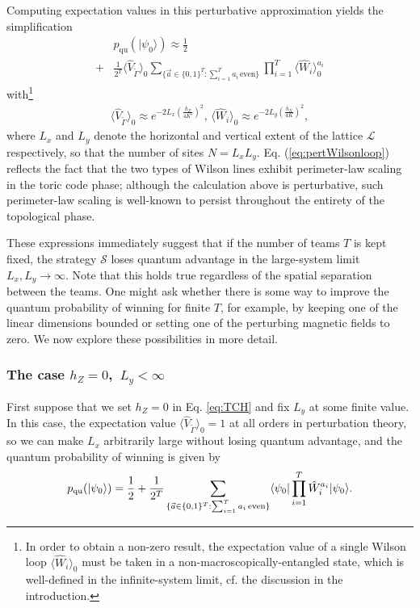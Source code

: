 \documentclass[prb,twocolumn,showpacs,amssymb,superscriptaddress]{revtex4-2}
\begin{document}
Computing expectation values in this perturbative approximation yields the simplification
\begin{align}
    \nonumber &p_{\mathrm{qu}}(|\psi_0\rangle) \approx \frac{1}{2} \\
+ &\frac{1}{2^T} \langle \hat{V}_{\widetilde{\Gamma}} \rangle_0 \sum_{\{\vec{a} \in \{0,1\}^T : \sum_{i=1}^T a_i \, \mathrm{even}\}} \prod_{i=1}^T \langle \hat{W}_i  \rangle_0^{a_i}
\end{align}
with\footnote{In order to obtain a non-zero result, the expectation value of a single Wilson loop $\langle \hat{W}_i \rangle_0$ must be taken in a non-macroscopically-entangled state, which is well-defined in the infinite-system limit, cf. the discussion in the introduction.}
\begin{align}
\label{eq:pertWilsonloop}
\langle \hat{V}_{\widetilde{\Gamma}} \rangle_0 \approx e^{-2L_x\left(\frac{h_Z}{4K'}\right)^2}, \,
\langle \hat{W}_{i} \rangle_0 \approx e^{-2L_y\left(\frac{h_X}{4K}\right)^2},
\end{align}
where $L_x$ and $L_y$ denote the horizontal and vertical extent of the lattice $\mathcal{L}$ respectively, so that the number of sites $N=L_xL_y$. Eq. (\ref{eq:pertWilsonloop}) reflects the fact that the two types of Wilson lines exhibit perimeter-law scaling in the toric code phase; although the calculation above is perturbative, such perimeter-law scaling is well-known to persist throughout the entirety of the topological phase\cite{gregor2011diagnosing}.

These expressions immediately suggest that if the number of teams $T$ is kept fixed, the strategy $\mathcal{S}$ loses quantum advantage in the large-system limit $L_x, L_y \to \infty$. Note that this holds true regardless of the spatial separation between the teams. One might ask whether there is some way to improve the quantum probability of winning for finite $T$, for example, by keeping one of the linear dimensions bounded or setting one of the perturbing magnetic fields to zero. We now explore these possibilities in more detail.

\subsubsection{The case $h_Z=0$,\, $L_y < \infty$}
First suppose that we set $h_Z = 0$ in Eq. \eqref{eq:TCH} and fix $L_y$ at some finite value. In this case, the expectation value $\langle \hat{V}_{\widetilde{\Gamma}}\rangle_0 = 1$ at all orders in perturbation theory, so we can make $L_x$ arbitrarily large without losing quantum advantage, and the quantum probability of winning is given by
\begin{equation}
p_{\mathrm{qu}}(|\psi_0\rangle) = \frac{1}{2} \\
+ \frac{1}{2^T} \sum_{\{\vec{a} \in \{0,1\}^T : \sum_{i=1}^T a_i \, \mathrm{even}\}} \langle \psi_0 | \prod_{i=1}^T \hat{W}_i^{a_i} | \psi_0\rangle.
\end{equation}
\end{document}
